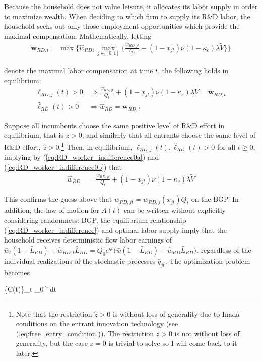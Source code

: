 \documentclass[11pt,english]{article}
\theoremstyle{remark}
\begin{document}
Because the household does not value leisure, it allocates its labor supply in order to maximize wealth. When deciding to which firm to supply its R\&D labor, the household seeks out only those employment opportunities which provide the maximal compensation. Mathematically, letting
\begin{align}
	\mathbf{w}_{RD,t} = \max \Big\{ \hat{w}_{RD} , \max_{j\in[0,1]} \big\{ \frac{w_{RD,jt}}{Q_t} + (1-x_{jt}) \nu (1-\kappa_e) \lambda \tilde{V} \big\} \Big\}
\end{align}

denote the maximal labor compensation at time $t$, the following holds in equilibrium:
\begin{align}
	\ell_{RD,j}(t) > 0 &\Rightarrow \frac{w_{RD,jt}}{Q_t} + (1-x_{jt}) \nu (1-\kappa_e) \lambda \tilde{V} = \mathbf{w}_{RD,t} \label{eq:RD_worker_indifference0a}\\
	\hat{\ell}_{RD}(t) > 0 &\Rightarrow \hat{w}_{RD} = \mathbf{w}_{RD,t} \label{eq:RD_worker_indifference0b}
\end{align}

Suppose all incumbents choose the same positive level of R\&D effort in equilibrium, that is $z > 0$; and similarly that all entrants choose the same level of R\&D effort, $\hat{z} > 0$.\footnote{Note that the restriction $\hat{z} > 0$ is without loss of generality due to Inada conditions on the entrant innovation technology (see (\ref{eq:free_entry_condition})). The restriction $z > 0$ is not without loss of generality, but the case $z = 0$ is trivial to solve so I will come back to it later.} Then, in equilibrium, $\ell_{RD,j}(t) , \hat{\ell}_{RD}(t) > 0$ for all $t \ge 0$, implying by (\ref{eq:RD_worker_indifference0a}) and (\ref{eq:RD_worker_indifference0b}) that
\begin{align}
\hat{w}_{RD} &= \frac{w_{RD,jt}}{Q_t} + (1-x_{jt}) \nu (1-\kappa_e) \lambda \tilde{V} \label{eq:RD_worker_indifference}
\end{align}

This confirms the guess above that $w_{RD,jt} = w_{RD,j}(x_{jt}) Q_t $ on the BGP. In addition, the law of motion for $A(t)$ can be written without explicitly considering randomness: BGP, the equilibrium relationship (\ref{eq:RD_worker_indifference}) and optimal labor supply imply that the household receives deterministic flow labor earnings of $\bar{w}_t(1 - \bar{L}_{RD}) + \hat{w}_{RD,t} \bar{L}_{RD} = Q_0 e^{gt} \big( \bar{w} (1-\bar{L}_{RD}) + \hat{w}_{RD} \bar{L}_{RD}\big) $,  regardless of the individual realizations of the stochastic processes $\bar{q}_{jt}$. The optimization problem becomes
\begin{maxi*}[0]
	{\{C(t)\}_{t}} {\int_0^{\infty}  dt}{}{}
\end{maxi*}
\end{document}
